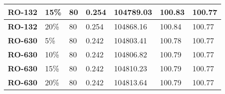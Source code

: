 \begin{table}[h!]
\begin{tabular}{|l|l|l|l|l|l|l|}
\textbf{RO-132}            & 15\%                                                                                         & 80                                                                                         & 0.254                                                                                & 104789.03                                                         & 100.83             & 100.77                                                                \\ \hline
\textbf{RO-132}            & 20\%                                                                                         & 80                                                                                         & 0.254                                                                                & 104868.16                                                         & 100.84             & 100.77                                                                \\ \hline
\textbf{RO-630}            & 5\%                                                                                          & 80                                                                                         & 0.242                                                                                & 104803.41                                                         & 100.78             & 100.77                                                                \\ \hline
\textbf{RO-630}            & 10\%                                                                                         & 80                                                                                         & 0.242                                                                                & 104806.82                                                         & 100.79             & 100.77                                                                \\ \hline
\textbf{RO-630}            & 15\%                                                                                         & 80                                                                                         & 0.242                                                                                & 104810.23                                                         & 100.79             & 100.77                                                                \\ \hline
\textbf{RO-630}            & 20\%                                                                                         & 80                                                                                         & 0.242                                                                                & 104813.64                                                         & 100.79             & 100.77                                                                \\ \hline
\end{tabular}
\label{CostWater}
\end{table}

